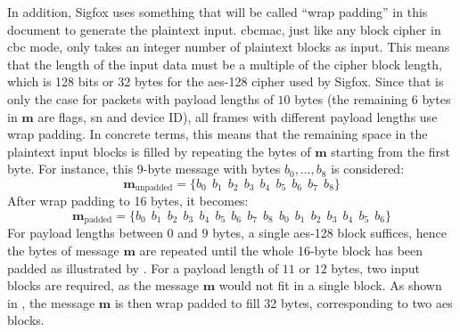 In addition, Sigfox uses something that will be called ``wrap padding'' in this document to generate the plaintext input.
\gls{cbcmac}, just like any block cipher in \gls{cbc} mode, only takes an integer number of plaintext blocks as input.
This means that the length of the input data must be a multiple of the cipher block length, which is 128 bits or 32 bytes for the \gls{aes}-128 cipher used by Sigfox.
Since that is only the case for packets with payload lengths of $10$ bytes (the remaining 6 bytes in $\mathbf m$ are flags, \gls{sn} and device ID), all frames with different payload lengths use wrap padding.
In concrete terms, this means that the remaining space in the plaintext input blocks is filled by repeating the bytes of $\mathbf m$ starting from the first byte.
For instance, this 9-byte message with bytes $b_0, \ldots, b_8$ is considered:
\begin{equation}
	\mathbf m_\text{unpadded} = \{ b_0 ~~ b_1 ~~ b_2 ~~ b_3 ~~ b_4 ~~ b_5 ~~ b_6 ~~ b_7 ~~ b_8 \}
\end{equation}
After wrap padding to 16 bytes, it becomes:
\begin{equation}
	\mathbf m_\text{padded} = \{ b_0 ~~ b_1 ~~ b_2 ~~ b_3 ~~ b_4 ~~ b_5 ~~ b_6 ~~ b_7 ~~ b_8 ~~ b_0 ~~ b_1 ~~ b_2 ~~ b_3 ~~ b_4 ~~ b_5 ~~ b_6 \}
\end{equation}
For payload lengths between $0$ and $9$ bytes, a single \gls{aes}-128 block suffices, hence the bytes of message $\mathbf m$ are repeated until the whole 16-byte block has been padded as illustrated by .
For a payload length of $11$ or $12$ bytes, two input blocks are required, as the message $\mathbf m$ would not fit in a single block.
As shown in , the message $\mathbf m$ is then wrap padded to fill 32 bytes, corresponding to two \gls{aes} blocks.

